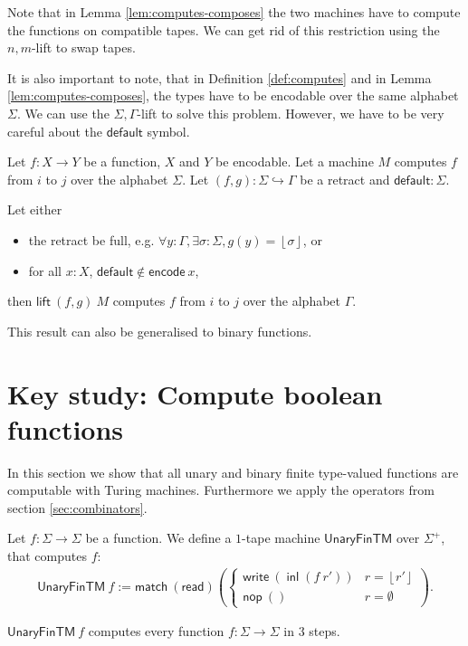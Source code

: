 \documentclass{psartcl}
\newcommand{\MS}[1]{\textsf{#1}}
\newcommand{\from}{:}
\renewcommand{\to}{\rightarrow}
\newcommand{\Some}[1]{\left\lfloor #1\right\rfloor}
\renewcommand{\None}{\emptyset}
\newcommand{\unit}{\mathbf{()}}
\newcommand{\Tau}{\Gamma}
\DeclareMathOperator{\inl}{\ensuremath{\MS{inl}}}
\begin{document}
Note that in Lemma \ref{lem:computes-composes} the two machines have to compute the functions on compatible tapes.
We can get rid of this restriction using the $n,m$-lift to swap tapes.

It is also important to note, that in Definition \ref{def:computes} and in Lemma \ref{lem:computes-composes}, the types have to be encodable over the
same alphabet $\Sigma$.  We can use the $\Sigma,\Tau$-lift to solve this problem.  However, we have to be very careful about the $\MS{default}$
symbol.

\begin{lemma}
  \label{lem:change-alphabet}
  Let $f \from X \to Y$ be a function, $X$ and $Y$ be encodable.
  Let a machine $M$ computes $f$ from $i$ to $j$ over the alphabet $\Sigma$.
  Let $(f,g) \from \Sigma \hookrightarrow \Tau$ be a retract and $\MS{default} : \Sigma$.

  Let either
  \begin{itemize}
    \item the retract be full, e.g. $\forall y:\Tau, \exists \sigma:\Sigma, g(y) = \Some{\sigma}$, or
    \item for all $x : X$, $\MS{default} \notin \MS{encode}~x$,
  \end{itemize}
  then $\MS{lift}~(f,g)~M$ computes $f$ from $i$ to $j$ over the alphabet $\Tau$.
\end{lemma}

This result can also be generalised to binary functions.


\section{Key study: Compute boolean functions}
\label{sec:bool-tm}

In this section we show that all unary and binary finite type-valued functions are computable with Turing machines.
Furthermore we apply the operators from section \ref{sec:combinators}.

Let $f \from \Sigma \to \Sigma$ be a function.  We define a $1$-tape machine $\MS{UnaryFinTM}$ over $\Sigma^+$, that computes $f$:
\begin{align*}
  \MS{UnaryFinTM}~f :=
  \MS{match}~(\MS{read})
  \left(
    \begin{cases}
      \MS{write}~(\inl(f~r'))   & r=\Some{r'} \\
      \MS{nop}~\unit            & r=\None
    \end{cases}
  \right).
\end{align*}
\begin{lemma}[Correctness of $\MS{UnaryFinTM}$]
  \label{lem:unary-fin-tm}
  $\MS{UnaryFinTM}~f$ computes every function $f\from\Sigma\to\Sigma$ in $3$ steps.
\end{lemma}
\end{document}
